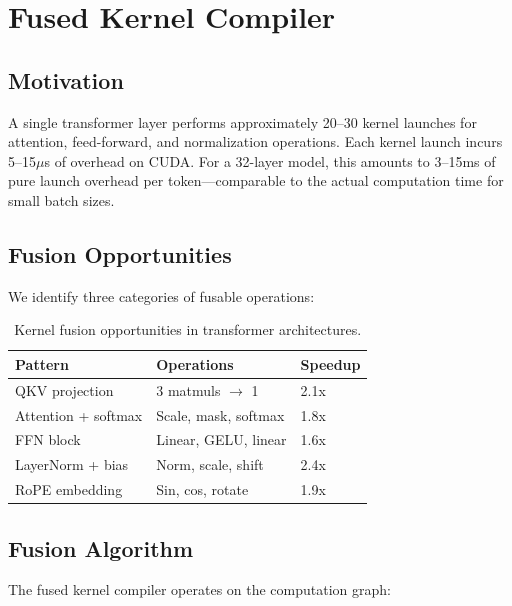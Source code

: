 \documentclass[11pt,twocolumn]{article}
\begin{document}
\section{Fused Kernel Compiler}
\label{sec:fusion}

\subsection{Motivation}

A single transformer layer performs approximately 20--30 kernel launches for attention, feed-forward, and normalization operations. Each kernel launch incurs 5--15$\mu$s of overhead on CUDA. For a 32-layer model, this amounts to 3--15ms of pure launch overhead per token---comparable to the actual computation time for small batch sizes.

\subsection{Fusion Opportunities}

We identify three categories of fusable operations:

\begin{table}[H]
\centering
\small
\begin{tabular}{lll}
\toprule
\textbf{Pattern} & \textbf{Operations} & \textbf{Speedup} \\
\midrule
QKV projection & 3 matmuls $\to$ 1 & 2.1x \\
Attention + softmax & Scale, mask, softmax & 1.8x \\
FFN block & Linear, GELU, linear & 1.6x \\
LayerNorm + bias & Norm, scale, shift & 2.4x \\
RoPE embedding & Sin, cos, rotate & 1.9x \\
\bottomrule
\end{tabular}
\caption{Kernel fusion opportunities in transformer architectures.}
\label{tab:fusion}
\end{table}

\subsection{Fusion Algorithm}

The fused kernel compiler operates on the computation graph:
\end{document}
